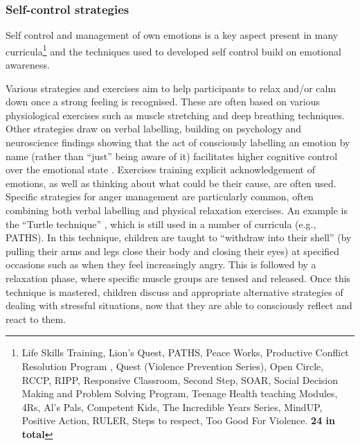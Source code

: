 \documentclass[prodmode,acmtochi]{acmsmall}
\newcommand{\todo}[1]{\textrm{\textrm{\textcolor{LightBlue}{[[#1]]}}}}
\newcommand{\todolater}[1]{}
\begin{document}
\subsubsection{Self-control strategies}
Self control and management of own emotions is a key aspect present in many curricula\footnote{Life Skills Training, Lion's Quest, PATHS, Peace Works, Productive Conflict Resolution Program , Quest (Violence Prevention Series), Open Circle, RCCP, RIPP, Responsive Classroom, Second Step, SOAR, Social Decision Making and Problem Solving Program, Teenage Health teaching Modules, 4Rs, Al's Pals, Competent Kids, The Incredible Years Series, MindUP, Positive Action, RULER, Steps to respect, Too Good For Violence. {\bf 24 in total}} and the techniques used to developed self control build on emotional awareness.%

Various strategies and exercises aim to help participants to relax and/or calm down once a strong feeling is recognised. These are often based on various physiological exercises such as muscle stretching and deep breathing techniques. Other strategies draw on verbal labelling, building on psychology and neuroscience findings showing that the act of consciously labelling an emotion by name (rather than ``just'' being aware of it) facilitates higher cognitive control over the emotional state \cite{Greenberg2006,Reyes2012}. Exercises training explicit acknowledgement of emotions, as well as thinking about what could be their cause, are often used. 
Specific strategies for anger management are particularly common, often combining both verbal labelling and physical relaxation exercises. An example is the ``Turtle technique'' \cite{Robin1976}, which is still used in a number of curricula (e.g., PATHS). In this technique, children are taught to ``withdraw into their shell'' (by pulling their arms and legs close their body and closing their eyes) at specified occasions such as when they feel increasingly angry. This is followed by a relaxation phase, where specific muscle groups are tensed and released. Once this technique is mastered, children discuss and appropriate alternative strategies of dealing with stressful situations, now that they are able to consciously reflect and react to them. 
\todolater{For older children, self-control exercises focus on supporting personal management more broadly, such as promoting goal setting, self-motivation and grit.}
\end{document}
